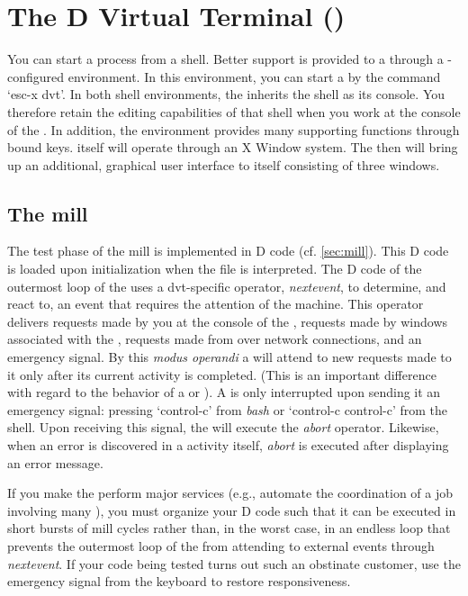 \newpage


\section{The  D Virtual Terminal ()}\label{sec:dvt}
You can start a  process from a shell. Better support is
provided to a  through a -configured 
environment. In this environment, you can start a  by the
 command `esc-x dvt'. In both shell environments, the
 inherits the shell as its console. You therefore retain the
editing capabilities of that shell when you work at the console of the
. In addition, the  environment provides many
 supporting functions through bound keys. 
itself will operate through an X Window system. The  then
will bring up an additional, graphical user interface to itself
consisting of three  windows.

\subsection{The  mill}

The test phase of the  mill is implemented in D code
(cf. \ref{sec:mill}). This D code is loaded upon initialization when
the file  is interpreted. The D code of the outermost
loop of the  uses a dvt-specific operator, \emph{nextevent},
to determine, and react to, an event that requires the attention of
the machine. This operator delivers requests made by you at the
console of the , requests made by windows associated with
the , requests made from  over network
connections, and an emergency signal. By this \emph{modus operandi} a
 will attend to new requests made to it only after its
current activity is completed. (This is an important difference with
regard to the behavior of a  or ). A
 is only interrupted upon sending it an emergency signal:
pressing `control-c' from \emph{bash} or `control-c control-c' from
the  shell. Upon receiving this signal, the 
will execute the \emph{abort} operator. Likewise, when an error is
discovered in a  activity itself, \emph{abort} is executed
after displaying an error message.

If you make the  perform major services (e.g., automate the
coordination of a job involving many ), you must organize
your D code such that it can be executed in short bursts of mill
cycles rather than, in the worst case, in an endless loop that
prevents the outermost loop of the  from attending to
external events through \emph{nextevent}. If your  code
being tested turns out such an obstinate customer, use the emergency
signal from the keyboard to restore  responsiveness.

